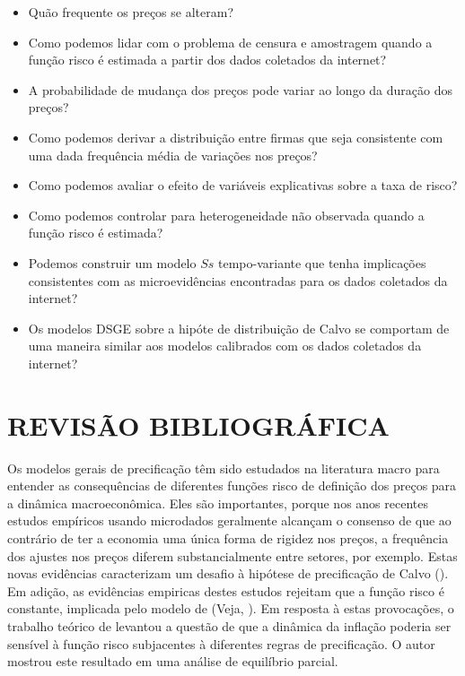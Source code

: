 \documentclass[twoside,a4paper,11pt]{report}
\begin{document}
\begin{itemize}
  \item Quão frequente os preços se alteram?
  \item Como podemos lidar com o problema de censura e amostragem quando a função risco é estimada a partir dos dados coletados da internet?
  \item A probabilidade de mudança dos preços pode variar ao longo da duração dos preços?
  \item Como podemos derivar a distribuição entre firmas que seja consistente com uma dada frequência média de variações nos preços?
  \item Como podemos avaliar o efeito de variáveis explicativas sobre a taxa de risco?
  \item Como podemos controlar para heterogeneidade não observada quando a função risco é estimada?
  \item Podemos construir um modelo $Ss$ tempo-variante que tenha implicações consistentes com as microevidências encontradas para os dados coletados da internet?
  \item Os modelos DSGE sobre a hipóte de distribuição de Calvo se comportam de uma maneira similar aos modelos calibrados com os dados coletados da internet?
\end{itemize}


\pagestyle{empty}
\cleardoublepage
\pagestyle{fancy}

\chapter{REVISÃO BIBLIOGRÁFICA}\label{cap2en02}

Os modelos gerais de precificação têm sido estudados na literatura macro para entender as consequências de diferentes funções risco de definição dos preços para a dinâmica macroeconômica. Eles são importantes, porque nos anos recentes estudos empíricos usando microdados geralmente alcançam o consenso de que ao contrário de ter a economia uma única forma de rigidez nos preços, a frequência dos ajustes nos preços diferem substancialmente entre setores, por exemplo. Estas novas evidências caracterizam um desafio à hipótese de precificação de Calvo (\citet{calvo1983staggered}). Em adição, as evidências empiricas destes estudos rejeitam que a função risco é constante, implicada pelo modelo de \citet{calvo1983staggered} (Veja, \citet{cecchetti1986frequency,alvarez2008micro,nakamura2008five}). Em resposta à estas provocações, o trabalho teórico de \citet{Wolman1999} levantou a questão de que a dinâmica da inflação poderia ser sensível à função risco subjacentes à diferentes regras de precificação. O autor mostrou este resultado em uma análise de equilíbrio parcial. 
\end{document}

